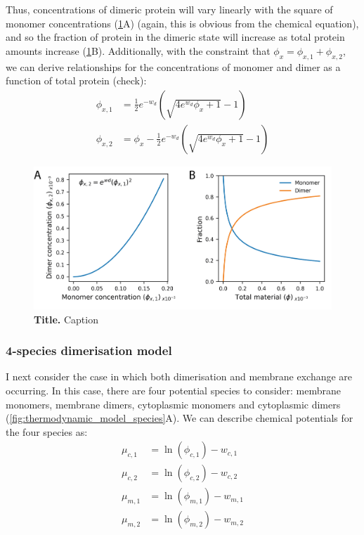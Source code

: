 \documentclass[12pt]{"article"}
\newcommand{\mycaption}[2]{\caption[#1]{\textbf{#1.} #2}}
\begin{document}
Thus, concentrations of dimeric protein will vary linearly with the square of monomer concentrations (\cref{fig:thermodynamic_simple_dimer}A) (again, this is obvious from the chemical equation), and so the fraction of protein in the dimeric state will increase as total protein amounts increase (\cref{fig:thermodynamic_simple_dimer}B). Additionally, with the constraint that $\phi_x = \phi_{x,1} + \phi_{x,2}$, we can derive relationships for the concentrations of monomer and dimer as a function of total protein (check):
\begin{align}
\phi_{x,1} &= \frac{1}{2}e^{-w_d}\left(\sqrt{4e^{w_d}\phi_x + 1} - 1\right)\\
\phi_{x,2} &= \phi_x - \frac{1}{2}e^{-w_d}\left(\sqrt{4e^{w_d}\phi_x + 1} - 1\right)
\end{align}

\begin{figure}[!h]
\includegraphics[scale=1]{thermodynamic_simple_dimer}
\setlength{\abovecaptionskip}{20pt}
\centering
\mycaption{Title}{Caption}
\label{fig:thermodynamic_simple_dimer}
\end{figure}


\subsubsection{4-species dimerisation model}

I next consider the case in which both dimerisation and membrane exchange are occurring. In this case, there are four potential species to consider: membrane monomers, membrane dimers, cytoplasmic monomers and cytoplasmic dimers (\cref{fig:thermodynamic_model_species}A). We can describe chemical potentials for the four species as:
\begin{align}
\mu_{c,1} &= \ln(\phi_{c,1}) - w_{c,1}\\
\mu_{c,2} &= \ln(\phi_{c,2}) - w_{c,2}\\
\mu_{m,1} &= \ln(\phi_{m,1}) - w_{m,1}\\
\mu_{m,2} &= \ln(\phi_{m,2}) - w_{m,2}
\end{align}
\end{document}
